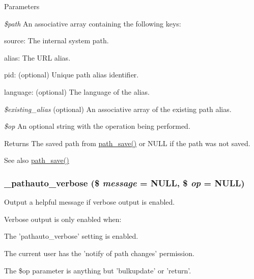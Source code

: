 \begin{DoxyParams}{Parameters}
\item[{\em \$path}]An associative array containing the following keys:
\begin{DoxyItemize}
\item source: The internal system path.
\item alias: The URL alias.
\item pid: (optional) Unique path alias identifier.
\item language: (optional) The language of the alias. 
\end{DoxyItemize}\item[{\em \$existing\_\-alias}](optional) An associative array of the existing path alias. \item[{\em \$op}]An optional string with the operation being performed.\end{DoxyParams}
\begin{DoxyReturn}{Returns}
The saved path from \hyperlink{path_8inc_a2560e9e01e6d4f6b38c4e55c39715e25}{path\_\-save()} or NULL if the path was not saved.
\end{DoxyReturn}
\begin{DoxySeeAlso}{See also}
\hyperlink{path_8inc_a2560e9e01e6d4f6b38c4e55c39715e25}{path\_\-save()} 
\end{DoxySeeAlso}
\hypertarget{pathauto_8inc_af1d110e621b254e3b2c925c824dd890a}{
\subsubsection[{\_\-pathauto\_\-verbose}]{\setlength{\rightskip}{0pt plus 5cm}\_\-pathauto\_\-verbose (\$ {\em message} = {\ttfamily NULL}, \/  \$ {\em op} = {\ttfamily NULL})}}
\label{pathauto_8inc_af1d110e621b254e3b2c925c824dd890a}
Output a helpful message if verbose output is enabled.

Verbose output is only enabled when:
\begin{DoxyItemize}
\item The 'pathauto\_\-verbose' setting is enabled.
\item The current user has the 'notify of path changes' permission.
\item The \$op parameter is anything but 'bulkupdate' or 'return'.
\end{DoxyItemize}


